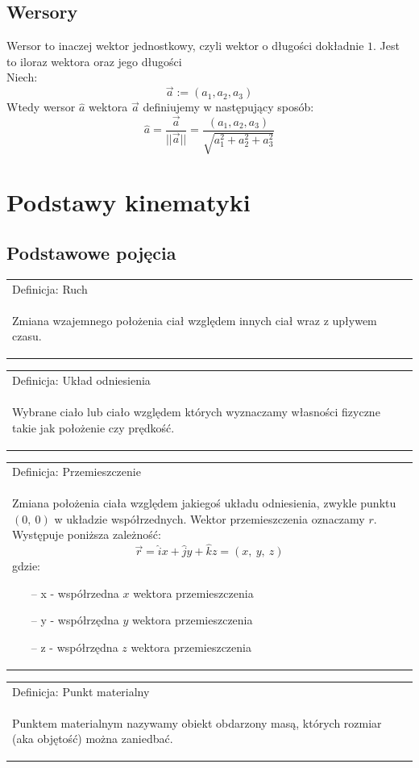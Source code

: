 \documentclass[a4paper]{article}
\newenvironment{definition}[2][Definicja]
    {
        \begin{center}
        \begin{tabular}{|p{1\textwidth}|}
        \hline
            #1: #2\\[2ex]
        \begin{em}
        \Large
    }
    { 
        \end{em}
        \\\hline
        \end{tabular} 
        \end{center}
    }
\begin{document}
    \subsection{\LARGE Wersory}
        \Large
        Wersor to inaczej wektor jednostkowy, czyli wektor o długości dokładnie $1$. Jest to 
        iloraz wektora oraz jego długości\\ 
        Niech:
        \[\vec{a} := (a_1, a_2, a_3)\]
        Wtedy wersor $\hat{a}$ wektora $\vec{a}$ definiujemy w następujący sposób:
        \[\hat{a} = \frac{\vec{a}}{||\vec{a}||} = \frac{(a_1, a_2, a_3)}{\sqrt{a_1^2 + a_2^2 + a_3^2}}\]
    \pagebreak
        
\section{\huge Podstawy kinematyki}
    \subsection{\LARGE Podstawowe pojęcia}
        \Large
        \begin{definition}{Ruch}
            Zmiana wzajemnego położenia ciał względem innych ciał wraz z upływem czasu.
        \end{definition}
        \begin{definition}{Układ odniesienia}
            Wybrane ciało lub ciało względem których wyznaczamy własności fizyczne takie jak położenie czy prędkość.
        \end{definition}
        \begin{definition}{Przemieszczenie}
            Zmiana położenia ciała względem jakiegoś układu odniesienia, zwykle punktu $(0,\ 0)$ w układzie współrzednych. 
            Wektor przemieszczenia oznaczamy $r$. Występuje poniższa zależność:
            \[\vec{r} = \hat{i}x + \hat{j}y + \hat{k}z = (x,\ y,\ z)\]
            gdzie:
            \begin{itemize}
                \item[--] x - współrzedna $x$ wektora przemieszczenia
                \item[--] y - współrzędna $y$ wektora przemieszczenia
                \item[--] z - współrzędna $z$ wektora przemieszczenia
            \end{itemize}
        \end{definition}
        \begin{definition}{Punkt materialny}
            Punktem materialnym nazywamy obiekt obdarzony masą, których rozmiar (aka objętość) można zaniedbać.
        \end{definition}
\end{document}
